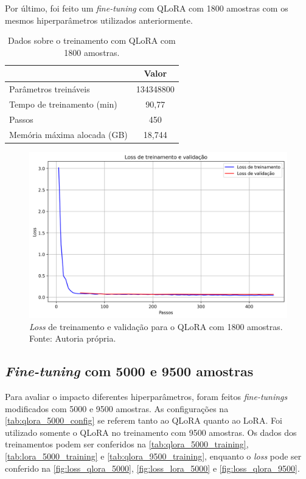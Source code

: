Por último, foi feito um \textit{fine-tuning} com \ac{QLoRA} com 1800 amostras com os mesmos hiperparâmetros utilizados anteriormente.

\clearpage

\begin{table}[ht]
    \caption{\small Dados sobre o treinamento com \ac{QLoRA} com 1800 amostras.}
    \centering
    \begin{tabular}{l|c}
        \hline
                                    & Valor     \\ \hline
        Parâmetros treináveis       & 134348800 \\
        Tempo de treinamento (min)  & 90,77     \\
        Passos                      & 450       \\
        Memória máxima alocada (GB) & 18,744    \\ \hline
    \end{tabular}
    \label{tab:qlora_2000_training}
\end{table}

\begin{figure}[ht]
    \centering
    \includegraphics[width=0.725\columnwidth,keepaspectratio]{images/loss_qlora_2000.png}
    \caption{\small \textit{Loss} de treinamento e validação para o \ac{QLoRA} com 1800 amostras. Fonte: Autoria própria.}
    \label{fig:loss_qlora_2000}
\end{figure}

\subsection{\textit{Fine-tuning} com 5000 e 9500 amostras}

Para avaliar o impacto diferentes hiperparâmetros, foram feitos \textit{fine-tunings} modificados com 5000 e 9500 amostras. As configurações na
\autoref{tab:qlora_5000_config} se referem tanto ao \ac{QLoRA} quanto ao \ac{LoRA}. Foi utilizado somente o \ac{QLoRA} no treinamento com 9500 amostras. Os dados dos
treinamentos podem ser conferidos na \autoref{tab:qlora_5000_training}, \autoref{tab:lora_5000_training} e \autoref{tab:qlora_9500_training}, enquanto o \textit{loss}
pode ser conferido na \autoref{fig:loss_qlora_5000}, \autoref{fig:loss_lora_5000} e \autoref{fig:loss_qlora_9500}.

